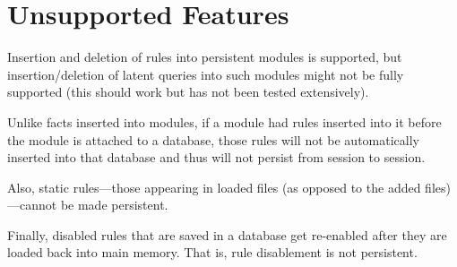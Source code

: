 \section{Unsupported Features}\label{sec-persist-unsupport}

Insertion and deletion of rules into persistent modules is supported, 
but insertion/deletion of latent queries into such modules 
might not be fully supported
(this should work but has not been tested extensively).

Unlike facts inserted into modules,
if a module had rules inserted into it before the module is attached to a
database,
those rules will not be automatically inserted into that database and thus
will not persist from session to session.

Also, static rules---those appearing in loaded files (as opposed to the
added files)---cannot be made persistent.

Finally, disabled rules that are saved in a database get re-enabled
after they are loaded back into main memory. That is, rule disablement is
not persistent.

